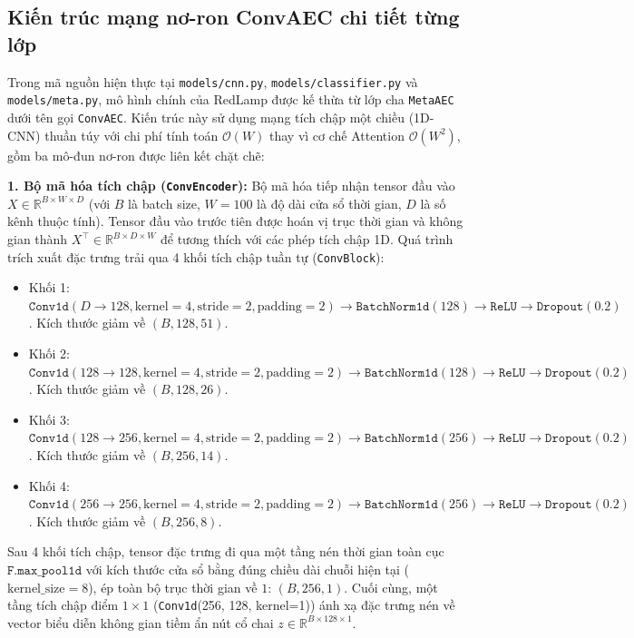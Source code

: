 \documentclass[sigconf,nonacm]{acmart}
\begin{document}
\subsection{Kiến trúc mạng nơ-ron ConvAEC chi tiết từng lớp}

Trong mã nguồn hiện thực tại \texttt{models/cnn.py}, \texttt{models/classifier.py} và \texttt{models/meta.py}, mô hình chính của RedLamp được kế thừa từ lớp cha \texttt{MetaAEC} dưới tên gọi \texttt{ConvAEC}. Kiến trúc này sử dụng mạng tích chập một chiều (1D-CNN) thuần túy với chi phí tính toán $\mathcal{O}(W)$ thay vì cơ chế Attention $\mathcal{O}(W^2)$, gồm ba mô-đun nơ-ron được liên kết chặt chẽ:

\textbf{1. Bộ mã hóa tích chập (\texttt{ConvEncoder}):}
Bộ mã hóa tiếp nhận tensor đầu vào $X \in \mathbb{R}^{B \times W \times D}$ (với $B$ là batch size, $W=100$ là độ dài cửa sổ thời gian, $D$ là số kênh thuộc tính). Tensor đầu vào trước tiên được hoán vị trục thời gian và không gian thành $X^{\top} \in \mathbb{R}^{B \times D \times W}$ để tương thích với các phép tích chập 1D. Quá trình trích xuất đặc trưng trải qua 4 khối tích chập tuần tự (\texttt{ConvBlock}):
\begin{itemize}[leftmargin=*, itemsep=1pt, parsep=0pt]
    \item Khối 1: $\texttt{Conv1d}(D \rightarrow 128, \text{kernel}=4, \text{stride}=2, \text{padding}=2) \rightarrow \texttt{BatchNorm1d}(128) \rightarrow \texttt{ReLU} \rightarrow \texttt{Dropout}(0.2)$. Kích thước giảm về $(B, 128, 51)$.
    \item Khối 2: $\texttt{Conv1d}(128 \rightarrow 128, \text{kernel}=4, \text{stride}=2, \text{padding}=2) \rightarrow \texttt{BatchNorm1d}(128) \rightarrow \texttt{ReLU} \rightarrow \texttt{Dropout}(0.2)$. Kích thước giảm về $(B, 128, 26)$.
    \item Khối 3: $\texttt{Conv1d}(128 \rightarrow 256, \text{kernel}=4, \text{stride}=2, \text{padding}=2) \rightarrow \texttt{BatchNorm1d}(256) \rightarrow \texttt{ReLU} \rightarrow \texttt{Dropout}(0.2)$. Kích thước giảm về $(B, 256, 14)$.
    \item Khối 4: $\texttt{Conv1d}(256 \rightarrow 256, \text{kernel}=4, \text{stride}=2, \text{padding}=2) \rightarrow \texttt{BatchNorm1d}(256) \rightarrow \texttt{ReLU} \rightarrow \texttt{Dropout}(0.2)$. Kích thước giảm về $(B, 256, 8)$.
\end{itemize}
Sau 4 khối tích chập, tensor đặc trưng đi qua một tầng nén thời gian toàn cục $\texttt{F.max\_pool1d}$ với kích thước cửa sổ bằng đúng chiều dài chuỗi hiện tại ($\text{kernel\_size}=8$), ép toàn bộ trục thời gian về $1$: $(B, 256, 1)$. Cuối cùng, một tầng tích chập điểm $1 \times 1$ (\texttt{Conv1d}(256, 128, kernel=1)) ánh xạ đặc trưng nén về vector biểu diễn không gian tiềm ẩn nút cổ chai $z \in \mathbb{R}^{B \times 128 \times 1}$.
\end{document}
